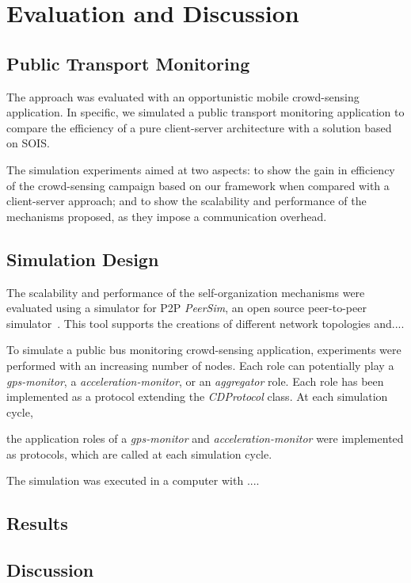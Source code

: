 \section{Evaluation and Discussion}\label{sec:evaluation}

\subsection{Public Transport Monitoring}

The approach was evaluated with an opportunistic mobile crowd-sensing application. In specific, we simulated a public transport monitoring application to compare the efficiency of a pure client-server architecture with a solution based on SOIS.

The simulation experiments aimed at two aspects: to show the gain in efficiency of the crowd-sensing campaign based on our framework when compared with a client-server approach; and to show the scalability and performance of the mechanisms proposed, as they impose a communication overhead. 

\subsection{Simulation Design}



The scalability and performance of the self-organization mechanisms were evaluated using a simulator for P2P  \textit{PeerSim}, an open source peer-to-peer simulator~\cite{p2p09-peersim}. This tool supports the creations of different network topologies and.... 

To simulate a public bus monitoring crowd-sensing application, experiments were performed with an increasing number of nodes. Each role can potentially play a \textit{gps-monitor}, a \textit{acceleration-monitor}, or an \textit{aggregator} role. Each role has been implemented as a protocol extending the \textit{CDProtocol} class. At each simulation cycle, 

the application roles of a \textit{gps-monitor} and \textit{acceleration-monitor} were implemented as protocols, which are called at each simulation cycle. 

The simulation was executed in a computer with .... 



\subsection{Results}

\subsection{Discussion}